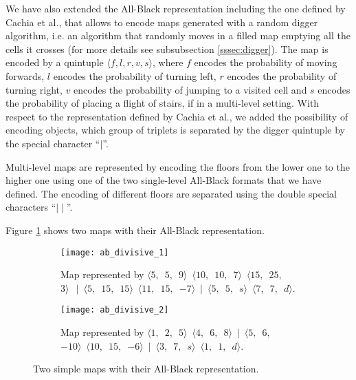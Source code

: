 \par

We have also extended the All-Black representation including the one defined by Cachia et al.\cite{MultiLevelEvolution}, that allows to encode maps generated with a random digger algorithm, i.e. an algorithm that randomly moves in a filled map emptying all the cells it crosses (for more details see subsubsection \ref{sssec:digger}). The map is encoded by a quintuple $\langle f,l,r,v,s \rangle$, where $f$ encodes the probability of moving forwards, $l$ encodes the probability of turning left, $r$ encodes the probability of turning right, $v$ encodes the probability of jumping to a visited cell and $s$ encodes the probability of placing a flight of stairs, if in a multi-level setting. With respect to the representation defined by Cachia et al., we added the possibility of encoding objects, which group of triplets is separated by the digger quintuple by the special character ``$\mid$''.

\par

Multi-level maps are represented by encoding the floors from the lower one to the higher one using one of the two single-level All-Black formats that we have defined. The encoding of different floors are separated using the double special characters ``$\mid\mid$''.

\par

Figure \ref{fig:allblack} shows two maps with their All-Black representation.

\begin{figure}[tp]
	\centering
	\hfill
  	\begin{subfigure}[t]{0.45\linewidth}
		\texttt{[image: ab\_divisive\_1]}
     		\caption{Map represented by $\langle 5, $\ $ 5, $\ $ 9 \rangle $\ $ \langle 10, $\ $ 10, $\ $ 7 \rangle $\ $  \langle 15, $\ $ 25, $\ $ 3 \rangle\ $\ $ \mid $\ $  \langle 5, $\ $ 15, $\ $ 15 \rangle $\ $  \langle 11, $\ $ 15, $\ $ -7 \rangle $\ $  \mid $\ $  \langle 5, $\ $ 5, $\ $ s \rangle $\ $  \langle 7, $\ $ 7, $\ $ d \rangle$.}
 	\end{subfigure}
 	\hfill
  	\begin{subfigure}[t]{0.45\linewidth}
    		\texttt{[image: ab\_divisive\_2]}
     		\caption{Map represented by $\langle 1,$\ $2, $\ $5  \rangle $\ $\langle4,$\ $6,$\ $8\rangle $\ $ \mid $\ $ \langle5,$\ $6,$\ $-10\rangle $\ $ \langle10,$\ $15,$\ $-6\rangle $\ $ \mid $\ $ \langle3, $\ $7, $\ $s\rangle $\ $ \langle1, $\ $1, $\ $d\rangle$.}
  	\end{subfigure}
  	\hfill
\caption{Two simple maps with their All-Black representation.}
\label{fig:allblack}
\end{figure}

